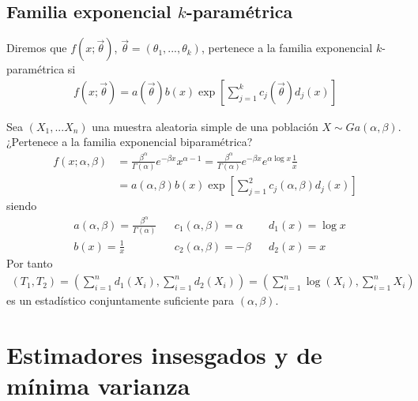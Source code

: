 \subsection{Familia exponencial $k$-paramétrica}

\begin{defi}
    Diremos que $f\left(x;\overrightarrow{\theta}\right)$, $\overrightarrow{\theta} = (\theta_1,...,\theta_k)$, pertenece a la familia exponencial $k$-paramétrica si
    \begin{align*}
        f(x;\overrightarrow{\theta}) = a\left(\overrightarrow{\theta}\right)b(x)\exp\left[ \sum_{j=1}^{k}{c_j\left(\overrightarrow{\theta}\right)d_j(x)}\right]
    \end{align*}
\end{defi}

\begin{ejemplo}
    Sea $(X_1,...X_n)$ una muestra aleatoria simple de una población $X \sim Ga(\alpha,\beta)$. ¿Pertenece a la familia exponencial biparamétrica?
    \begin{align*}
        f(x;\alpha,\beta) & = \frac{\beta^{\alpha}}{\Gamma(\alpha)}e^{-\beta x}x^{\alpha -1} = \frac{\beta^{\alpha}}{\Gamma(\alpha)}e^{-\beta x}e^{\alpha\log x} \frac{1}{x} \\
                          & = a\left(\alpha,\beta\right)b(x)\exp\left[ \sum_{j=1}^{2}{c_j\left(\alpha,\beta\right)d_j(x)}\right]
    \end{align*}
    siendo
    \begin{align*}
         & a(\alpha, \beta) =  \frac{\beta^{\alpha}}{\Gamma(\alpha)} &  & c_1(\alpha,\beta) = \alpha &  & d_1(x) = \log x \\
         & b(x) = \frac{1}{x}                                        &  & c_2(\alpha,\beta) = -\beta &  & d_2(x) = x
    \end{align*}
    Por tanto
    \begin{align*}
        (T_1,T_2) = \left( \sum_{i=1}^{n}{d_1(X_i)}, \sum_{i=1}^{n}{d_2(X_i)}\right) = \left( \sum_{i=1}^{n}{\log(X_i)}, \sum_{i=1}^{n}{X_i}\right)
    \end{align*}
    es un estadístico conjuntamente suficiente para $(\alpha,\beta)$.
\end{ejemplo}

\section{Estimadores insesgados y de mínima varianza}

